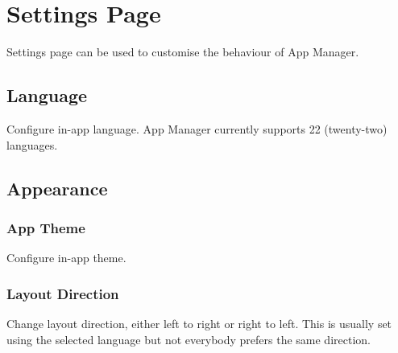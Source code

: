 \section{Settings Page}\label{sec:settings-page} %
Settings page can be used to customise the behaviour of App Manager.

\subsection{Language}\label{subsec:language} %
Configure in-app language. App Manager currently supports 22 (twenty-two) languages.

\subsection{Appearance}\label{subsec:appearance} %

\subsubsection{App Theme}\label{subsubsec:app-theme} %
Configure in-app theme.

\subsubsection{Layout Direction}\label{subsubsec:layout-direction} %
Change layout direction, either left to right or right to left. This is usually set using the selected language but not
everybody prefers the same direction.

